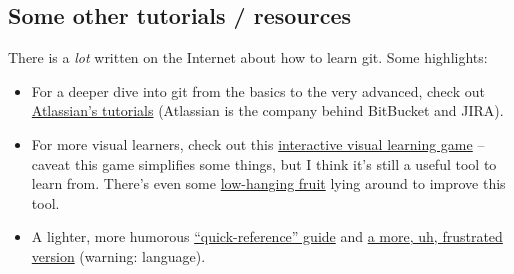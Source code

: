 \documentclass{article}
\begin{document}
\medskip
\noindent
{}


\subsection*{Some other tutorials / resources}

There is a \emph{lot} written on the Internet about how to learn git. Some
highlights:

\begin{itemize}
  \item For a deeper dive into git from the basics to the very advanced, check
    out \href{https://www.atlassian.com/git/tutorials}{Atlassian's tutorials}
    (Atlassian is the company behind BitBucket and JIRA).
  \item For more visual learners, check out this
    \href{http://pcottle.github.io/learnGitBranching/}{interactive visual
    learning game} -- caveat this game simplifies some things, but I think
    it's still a useful tool to learn from.  There's even some
    \href{https://github.com/pcottle/learnGitBranching/issues/201}{low-hanging
    fruit} lying around to improve this tool.
  \item A lighter, more humorous
    \href{http://adriansampson.net/blog/git.html}{``quick-reference'' guide}
    and \href{http://ohshitgit.com/}{a more, uh, frustrated version} (warning:
    language).
\end{itemize}
\end{document}
